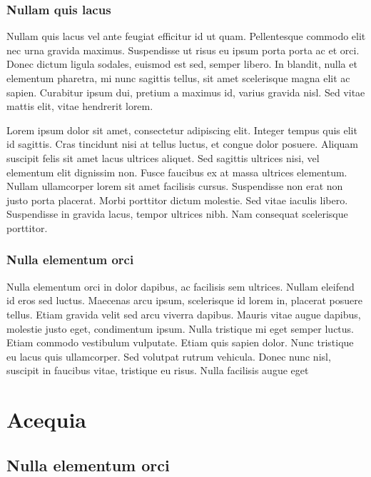 \subsubsection{Nullam quis lacus}

Nullam quis lacus vel ante feugiat efficitur id ut quam. Pellentesque commodo elit nec urna gravida maximus. Suspendisse ut risus eu ipsum porta porta ac et orci. Donec dictum ligula sodales, euismod est sed, semper libero. In blandit, nulla et elementum pharetra, mi nunc sagittis tellus, sit amet scelerisque magna elit ac sapien. Curabitur ipsum dui, pretium a maximus id, varius gravida nisl. Sed vitae mattis elit, vitae hendrerit lorem.

Lorem ipsum dolor sit amet, consectetur adipiscing elit. Integer tempus quis elit id sagittis. Cras tincidunt nisi at tellus luctus, et congue dolor posuere. Aliquam suscipit felis sit amet lacus ultrices aliquet. Sed sagittis ultrices nisi, vel elementum elit dignissim non. Fusce faucibus ex at massa ultrices elementum. Nullam ullamcorper lorem sit amet facilisis cursus. Suspendisse non erat non justo porta placerat. Morbi porttitor dictum molestie. Sed vitae iaculis libero. Suspendisse in gravida lacus, tempor ultrices nibh. Nam consequat scelerisque porttitor.

\subsubsection{Nulla elementum orci}

Nulla elementum orci in dolor dapibus, ac facilisis sem ultrices. Nullam eleifend id eros sed luctus. Maecenas arcu ipsum, scelerisque id lorem in, placerat posuere tellus. Etiam gravida velit sed arcu viverra dapibus. Mauris vitae augue dapibus, molestie justo eget, condimentum ipsum. Nulla tristique mi eget semper luctus. Etiam commodo vestibulum vulputate. Etiam quis sapien dolor. Nunc tristique eu lacus quis ullamcorper. Sed volutpat rutrum vehicula. Donec nunc nisl, suscipit in faucibus vitae, tristique eu risus. Nulla facilisis augue eget


\section{Acequia}

\subsection{Nulla elementum orci}

